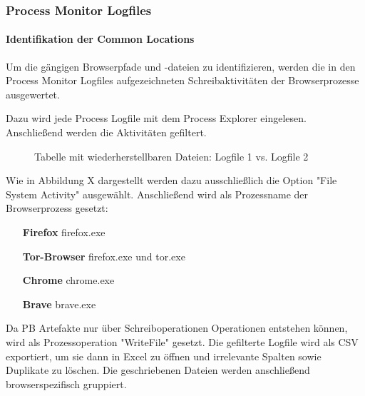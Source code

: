 \subsubsection*{Process Monitor Logfiles}
\label{subsubsection:methodik-datenanalyse-commonlocations-processmonitorlogfiles}
\paragraph*{Identifikation der Common Locations}
Um die gängigen Browserpfade und -dateien zu identifizieren, werden die in den Process Monitor Logfiles aufgezeichneten Schreibaktivitäten der Browserprozesse ausgewertet.

Dazu wird jede Process Logfile mit dem Process Explorer eingelesen. Anschließend werden die Aktivitäten gefiltert.
\begin{figure}[h!]
	\centerline{}
	\caption{Tabelle mit wiederherstellbaren Dateien: Logfile 1 vs. Logfile 2}
\end{figure}
Wie in Abbildung X dargestellt werden dazu ausschließlich die Option "File System Activity" ausgewählt.
Anschließend wird als Prozessname der Browserprozess gesetzt:
\begin{itemize}
\item[\textbf{Firefox}] firefox.exe
\item[\textbf{Tor-Browser}] firefox.exe und tor.exe
\item[\textbf{Chrome}] chrome.exe
\item[\textbf{Brave}] brave.exe
\end{itemize}
Da PB Artefakte nur über Schreiboperationen Operationen entstehen können, wird als Prozessoperation "WriteFile" gesetzt.
Die gefilterte Logfile wird als CSV exportiert, um sie dann in Excel zu öffnen und irrelevante Spalten sowie Duplikate zu löschen.
Die geschriebenen Dateien werden anschließend browserspezifisch gruppiert.

